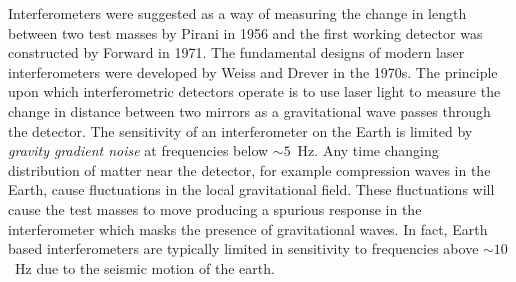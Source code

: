 Interferometers were suggested as a way of measuring the change in 
length between two test masses by Pirani in 1956\cite{Pirani:1956} and
the first working detector was constructed by Forward in
1971\cite{Forward:1971}. The fundamental designs of modern laser
interferometers were developed by Weiss\cite{Weiss:1972} and
Drever\cite{Drever:1980} in the 1970s. The principle upon which
interferometric detectors operate is to use laser light to measure the change
in distance between two mirrors as a gravitational wave passes through the
detector.  The sensitivity of an interferometer on the Earth is limited by
\emph{gravity gradient noise} at frequencies below $\sim
5$~Hz\cite{Saulson:1994}.  Any time changing distribution of matter near the
detector, for example compression waves in the Earth, cause fluctuations in
the local gravitational field. These fluctuations will cause the test masses
to move producing a spurious response in the interferometer which masks the
presence of gravitational waves. In fact, Earth based interferometers are
typically limited in sensitivity to frequencies above $\sim 10$~Hz due to the
seismic motion of the earth.


